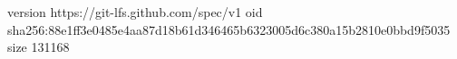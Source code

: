 version https://git-lfs.github.com/spec/v1
oid sha256:88e1ff3e0485e4aa87d18b61d346465b6323005d6c380a15b2810e0bbd9f5035
size 131168
